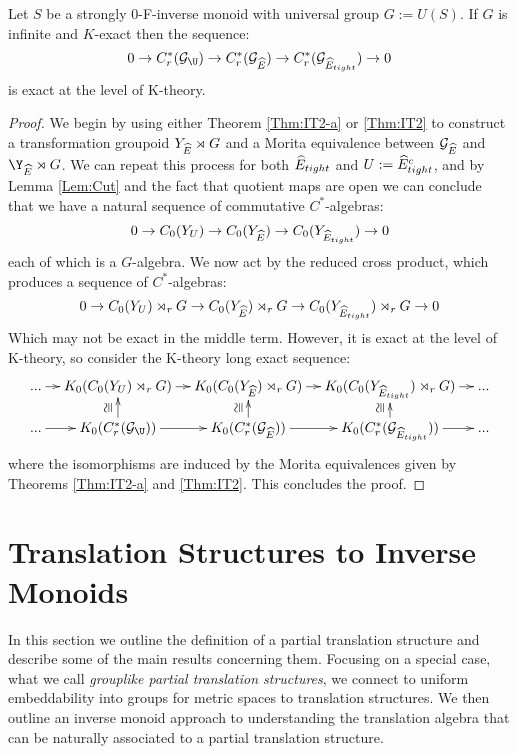 \begin{corollary}
\begin{theorem}\label{thm:PV2}
Let $S$ be a strongly $0$-F-inverse monoid with universal group $G:=U(S)$. If $G$ is infinite and $K$-exact then the sequence:
\begin{equation*}
0 \rightarrow C^{*}_{r}(\G_{\U}) \rightarrow C^{*}_{r}(\G_{\E}) \rightarrow C^{*}_{r}(\G_{\E_{tight}}) \rightarrow 0
\end{equation*}
is exact at the level of K-theory.  
\end{theorem}
\begin{proof}
We begin by using either Theorem \ref{Thm:IT2-a} or \ref{Thm:IT2} to construct a transformation groupoid $Y_{\widehat{E}}\rtimes G$ and a Morita equivalence between $\mathcal{G}_{\widehat{E}}$ and $\Y_{\E}\rtimes G$. We can repeat this process for both $\widehat{E}_{tight}$ and $U:=\widehat{E}_{tight}^{c}$, and by Lemma \ref{Lem:Cut} and the fact that quotient maps are open we can conclude that we have a natural sequence of commutative $C^{*}$-algebras:
\begin{equation*}
0 \rightarrow C_{0}(Y_{U}) \rightarrow C_{0}(Y_{\widehat{E}}) \rightarrow C_{0}(Y_{\widehat{E}_{tight}}) \rightarrow 0
\end{equation*}
each of which is a $G$-algebra. We now act by the reduced cross product, which produces a sequence of $C^{*}$-algebras:
\begin{equation*}
0 \rightarrow C_{0}(Y_{U})\rtimes_{r}G \rightarrow C_{0}(Y_{\widehat{E}})\rtimes_{r}G \rightarrow C_{0}(Y_{\widehat{E}_{tight}})\rtimes_{r}G \rightarrow 0
\end{equation*}
Which may not be exact in the middle term. However, it is exact at the level of K-theory, so consider the K-theory long exact sequence:
\begin{equation*}
\xymatrix@=1em{...\ar[r] & K_{0}(C_{0}(Y_{U})\rtimes_{r} G) \ar[r]& K_{0}(C_{0}(Y_{\E})\rtimes_{r} G) \ar[r]& K_{0}(C_{0}(Y_{\E_{tight}})\rtimes_{r} G)\ar[r] & ...\\
...\ar[r] & K_{0}(C^{*}_{r}(\G_{\U})) \ar[r]\ar[u]^{\ucong}& K_{0}(C^{*}_{r}(\G_{\E})) \ar[r]\ar[u]^{\ucong}& K_{0}(C^{*}_{r}(\G_{\E_{tight}})) \ar[r]\ar[u]^{\ucong}& ...}
\end{equation*}
where the isomorphisms are induced by the Morita equivalences given by Theorems \ref{Thm:IT2-a} and \ref{Thm:IT2}. This concludes the proof.
\end{proof}


\section{Translation Structures to Inverse Monoids}
In this section we outline the definition of a partial translation structure and describe some of the main results concerning them. Focusing on a special case, what we call \textit{grouplike partial translation structures}, we connect to uniform embeddability into groups for metric spaces to translation structures.  We then outline an inverse monoid approach to understanding the translation algebra that can be naturally associated to a partial translation structure.


\end{corollary}
